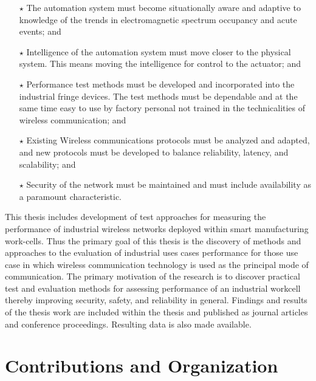 \documentclass[12pt]{article}
\begin{document}
		\begin{itemize}
			\item[$\star$] The automation system must become situationally aware and adaptive to knowledge of the trends in electromagnetic spectrum occupancy and acute events; and
			
			\item[$\star$] Intelligence of the automation system must move closer to the physical system.  This means moving the intelligence for control to the actuator; and  
			
			\item[$\star$] Performance test methods must be developed and incorporated into the industrial fringe devices.  The test methods must be dependable and at the same time easy to use by factory personal not trained in the technicalities of wireless communication; and
			
			\item[$\star$] Existing Wireless communications protocols must be analyzed and adapted, and new protocols must be developed to balance reliability, latency, and scalability; and
			 
			\item[$\star$] Security of the network must be maintained and must include availability as a paramount characteristic.
		\end{itemize}
		
		This thesis includes development of test approaches for measuring the performance of industrial wireless networks deployed within smart manufacturing work-cells.  Thus the primary goal of this thesis is the discovery of methods and approaches to the evaluation of industrial uses cases performance for those use case in which wireless communication technology is used as the principal mode of communication.  The primary motivation of the research is to discover practical test and evaluation methods for assessing performance of an industrial workcell thereby improving security, safety, and reliability in general.   Findings and results of the thesis work are included within the thesis and published as journal articles and conference proceedings.  Resulting data is also made available.
		
		\section*{Contributions and Organization}
		
\end{document}

